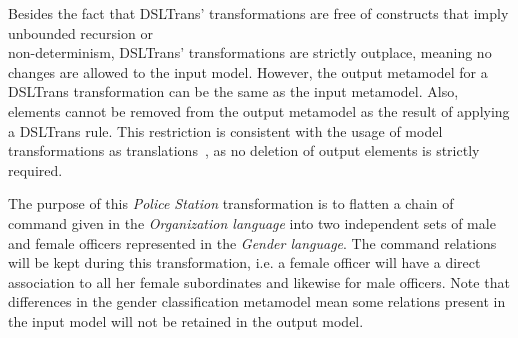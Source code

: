 Besides the fact that DSLTrans' transformations are free of constructs that
imply unbounded recursion or \\non-determinism, DSLTrans' transformations are strictly outplace, meaning no changes are allowed to the input model. However, the output metamodel for a DSLTrans transformation can
be the same as the input metamodel. Also, elements cannot be removed
from the output metamodel as the result of applying a DSLTrans rule.
This restriction is consistent with the usage of model transformations as
translations~\cite{AMT2012}, as no deletion of output elements is strictly required.

The purpose of this \emph{Police Station} transformation is to flatten a chain of command given
in the \emph{Organization language} into two independent sets of male
and female officers represented in the \emph{Gender language}. The command
relations will be kept during this transformation, i.e. a female officer will
have a direct association to all her female subordinates and likewise for male
officers. Note that differences in the gender classification metamodel mean
some relations present in the input model will not be retained in the output
model.

